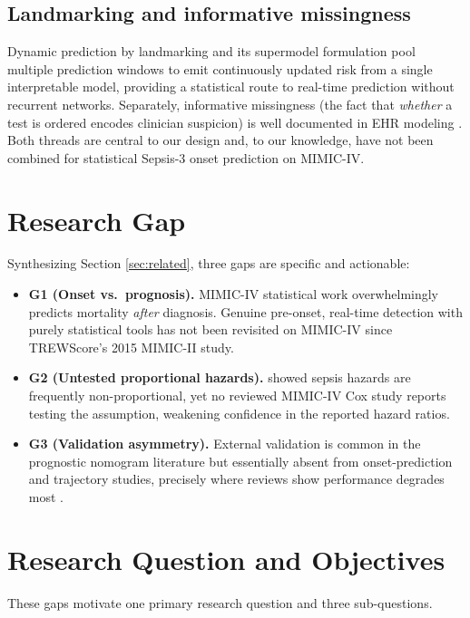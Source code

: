 \documentclass[conference]{IEEEtran}
\begin{document}
\subsection{Landmarking and informative missingness}
Dynamic prediction by landmarking \cite{vanhouwelingen2007landmark} and its
supermodel formulation \cite{fries2023dynamiclm} pool multiple prediction
windows to emit continuously updated risk from a single interpretable model,
providing a statistical route to real-time prediction without recurrent
networks. Separately, informative missingness (the fact that \emph{whether} a
test is ordered encodes clinician suspicion) is well documented in EHR
modeling \cite{groenwold2020missingness,singh2021missingness}. Both threads are
central to our design and, to our knowledge, have not been combined for
statistical Sepsis-3 onset prediction on MIMIC-IV.

\section{Research Gap}
\label{sec:gap}
Synthesizing Section \ref{sec:related}, three gaps are specific and actionable:

\begin{itemize}
\item \textbf{G1 (Onset vs.\ prognosis).} MIMIC-IV statistical work overwhelmingly
predicts mortality \emph{after} diagnosis. Genuine pre-onset, real-time
detection with purely statistical tools has not been revisited on MIMIC-IV
since TREWScore's 2015 MIMIC-II study.
\item \textbf{G2 (Untested proportional hazards).}
\textcite{kasal2004cox} showed sepsis hazards are frequently non-proportional, yet
no reviewed MIMIC-IV Cox study reports testing the assumption, weakening
confidence in the reported hazard ratios.
\item \textbf{G3 (Validation asymmetry).} External validation is common in the
prognostic nomogram literature but essentially absent from onset-prediction and
trajectory studies, precisely where reviews show performance degrades most
\cite{wang2025srpm}.
\end{itemize}

\section{Research Question and Objectives}
\label{sec:rq}
These gaps motivate one primary research question and three sub-questions.
\end{document}
